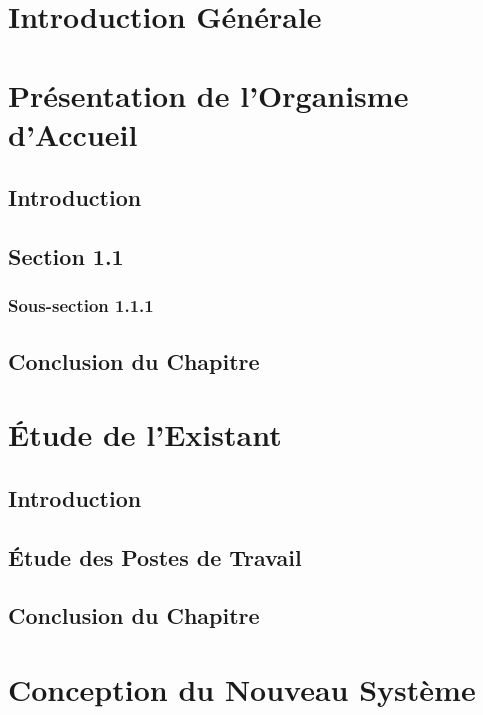 \documentclass[12pt,a4paper]{report}
\begin{document}
\newpage
\chapter*{Introduction Générale}

\chapter{Présentation de l'Organisme d'Accueil}

\section*{Introduction}

\section{Section 1.1}
\subsection{Sous-section 1.1.1}

\section*{Conclusion du Chapitre}

\chapter{Étude de l'Existant}
\section*{Introduction}
\section{Étude des Postes de Travail}
\section*{Conclusion du Chapitre}

\chapter{Conception du Nouveau Système}
\end{document}
